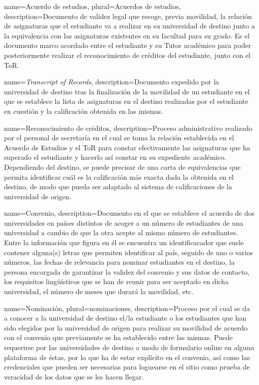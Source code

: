 \makeglossaries

{
	name=Acuerdo de estudios,
	plural=Acuerdos de estudios,
	description={Documento de validez legal que recoge, previa movilidad, la relación de asignaturas que el estudiante va a realizar en su universidad de destino junto a la equivalencia con las asignaturas existentes en su facultad para su grado. Es el documento marco acordado entre el estudiante y su \gls{Tutor} académico para poder posteriormente realizar el reconocimiento de créditos del estudiante, junto con el \gls{ToR}.}
}

{
	name=\textit{Transcript of Records},
	description={Documento expedido por la universidad de destino tras la finalización de la movilidad de un estudiante en el que se establece la lista de asignaturas en el destino realizadas por el estudiante en cuestión y la calificación obtenida en las mismas.}
}

{
	name=Reconocimiento de créditos,
	description={Proceso administrativo realizado por el personal de secretaría en el cual se toma la relación establecida en el Acuerdo de Estudios y el \gls{ToR} para constar efectivamente las asignaturas que ha superado el estudiante y hacerlo así constar en su expediente académico. Dependiendo del destino, se puede precisar de una carta de equivalencias que permita identificar cuál es la calificación más exacta dada la obtenida en el destino, de modo que pueda ser adaptado al sistema de calificaciones de la universidad de origen.}
}

{
	name=Convenio,
	description={Documento en el que se establece el acuerdo de dos universidades en países distintos de acoger a un número de estudiantes de una universidad a cambio de que la otra acepte al mismo número de estudiantes. Entre la información que figura en él se encuentra un identificacador que suele contener alguna(s) letras que permiten identificar al país, seguido de uno o varios números, las fechas de relevancia para nominar estudiantes en el destino, la persona encargada de garantizar la validez del convenio y sus datos de contacto, los requisitos lingüísticos que se han de reunir para ser aceptado en dicha universidad, el número de meses que durará la movilidad, etc.}
}

{
	name=Nominación,
	plural=nominaciones,
	description={Proceso por el cual se da a conocer a la universidad de destino el/la estudiante o los estudiantes que han sido elegidos por la universidad de origen para realizar su movilidad de acuerdo con el convenio que previamente se ha establecido entre las mismas. Puede requerirse por las universidades de destino a modo de formulario online en alguna plataforma de éstas, por lo que ha de estar explícito en el convenio, así como las credenciales que pueden ser necesarias para loguearse en el sitio como prueba de veracidad de los datos que se les hacen llegar.}
}

